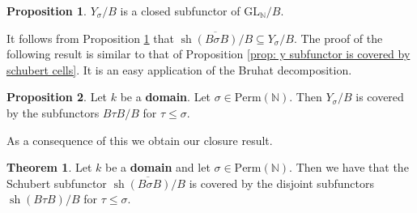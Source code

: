 \documentclass[oneside,11pt]{amsart}
\newcommand{\nn}{\ensuremath{\mathbb{N}}}
\newcommand{\GL}{\ensuremath{\text{GL}}}
\newcommand{\Perm}{\ensuremath{\text{Perm}}}
\newcommand{\sh}{\operatorname{sh}}
\theoremstyle{definition}
\newtheorem{proof techniques}{Proof Techniques}
\newtheorem{theorem}{Theorem}
\newtheorem{proposition}{Proposition}
\begin{document}
\begin{proposition}\label{ref: quotient of y subfunctor is closed}
$Y_\sigma / B$ is a closed subfunctor of $\GL_\nn/B$. 
\end{proposition}



It follows from Proposition \ref{ref: quotient of y subfunctor is closed} that $\overline{\sh(B \sigma B) / B} \subseteq Y_\sigma / B$. The proof of the following result is similar to that of Proposition \ref{prop: y subfunctor is covered by schubert cells}. It is an easy application of the Bruhat decomposition. 

\begin{proposition}
Let $k$ be a \textbf{domain}. Let $\sigma \in \Perm(\nn)$. Then $Y_\sigma / B$ is covered by the subfunctors $B \tau B / B$ for $\tau \leq \sigma$. 
\end{proposition}


As a consequence of this we obtain our closure result. 

\begin{theorem}
Let $k$ be a \textbf{domain} and let $\sigma \in \Perm(\nn)$. Then we have that the Schubert subfunctor $\overline{\sh(B \sigma B) / B}$ is covered by the disjoint subfunctors $\sh(B \tau B) / B$ for $\tau \leq \sigma$. 
\end{theorem}


















\end{document}
